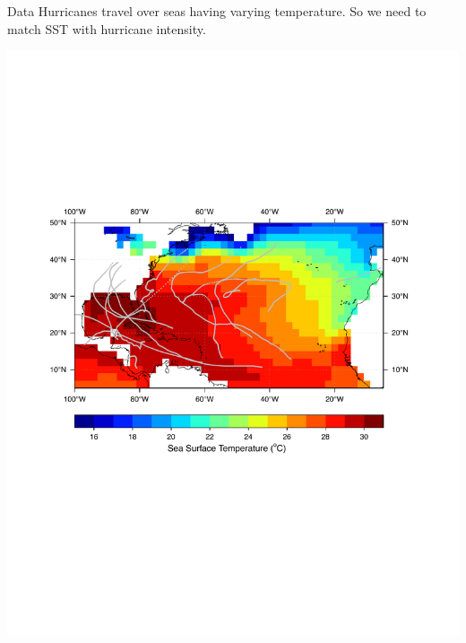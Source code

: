 \documentclass[handout]{beamer}
\begin{document}
\begin{frame}{Data}
Hurricanes travel over seas having varying temperature. So we need to match SST with hurricane intensity.
\begin{center}
\vspace{-3.25cm}
\includegraphics[scale=.5]{figures/TracksSST.pdf}\\
\end{center}
\end{frame}
\end{document}
